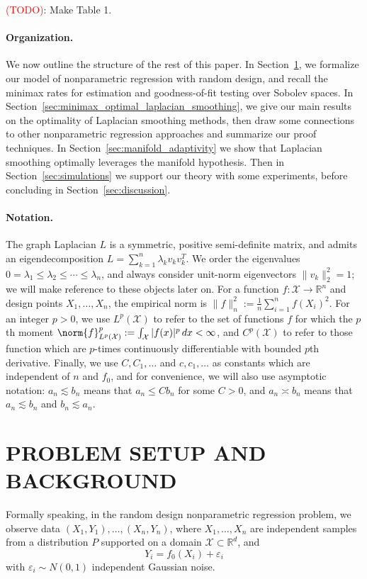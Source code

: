 \documentclass[twoside]{article}
\newcommand{\Reals}{\mathbb{R}}
\newcommand{\1}{\mathbf{1}}
\newcommand{\Xset}{\mathcal{X}}
\newcommand{\Leb}{L}
\theoremstyle{definition}
\theoremstyle{remark}
\begin{document}
\textcolor{red}{(TODO)}: Make Table 1. 

\paragraph{Organization.}
We now outline the structure of the rest of this paper. In Section~\ref{sec:problem_setup_and_background}, we formalize our model of nonparametric regression with random design, and recall the minimax rates for estimation and goodness-of-fit testing over Sobolev spaces. In Section~\ref{sec:minimax_optimal_laplacian_smoothing}, we give our main results on the optimality of Laplacian smoothing methods, then draw some connections to other nonparametric regression approaches and summarize our proof techniques. In Section~\ref{sec:manifold_adaptivity} we show that Laplacian smoothing optimally leverages the manifold hypothesis. Then in Section~\ref{sec:simulations} we support our theory with some experiments, before concluding in Section~\ref{sec:discussion}.


\paragraph{Notation.}
The graph Laplacian $L$ is a symmetric, positive semi-definite matrix, and admits an eigendecomposition $L = \sum_{k = 1}^{n} \lambda_k v_k v_k^T$. We order the eigenvalues $0 = \lambda_1 \leq \lambda_2 \leq \cdots \leq \lambda_n$, and always consider unit-norm eigenvectors $\|v_k\|_2^2 = 1$; we will make reference to these objects later on. For a function $f: \Xset \to \Reals^n$ and design points $X_1,\ldots,X_n$, the empirical norm is $\|f\|_n^2 := \frac{1}{n}\sum_{i = 1}^{n} f(X_i)^2$. For an integer $p > 0$, we use $\Leb^p(\Xset)$ to refer to the set of functions $f$ for which the $p$th moment $\norm{f}_{\Leb^p(\Xset)}^p := \int_{\Xset} |f(x)|^p \,dx < \infty$, and $C^p(\Xset)$ to refer to those function which are $p$-times continuously differentiable with bounded $p$th derivative. Finally, we use $C,C_1,\ldots$ and $c,c_1,\ldots$ as constants which are independent of $n$ and $f_0$, and for convenience, we will also use asymptotic notation: $a_n \lesssim b_n$ means that $a_n \leq Cb_n$ for some $C > 0$, and $a_n \asymp b_n$ means that $a_n \lesssim b_n$ and $b_n \lesssim a_n$.

\section{PROBLEM SETUP AND BACKGROUND}
\label{sec:problem_setup_and_background}
Formally speaking, in the random design nonparametric regression problem, we observe data $(X_1,Y_1),\ldots,(X_n,Y_n)$, where $X_1,\ldots,X_n$ are independent samples from a distribution $P$ supported on a domain $\Xset \subset \Reals^d$, and 
\begin{equation}
\label{eqn:random_design_regression}
Y_i = f_0(X_i) + \varepsilon_i
\end{equation}
with $\varepsilon_i \sim N(0,1)$ independent Gaussian noise. 
\end{document}
